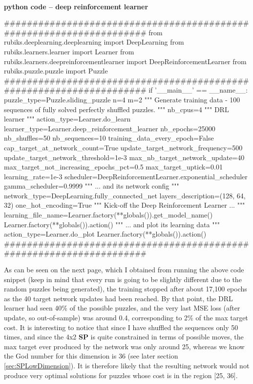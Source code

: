 \paragraph{}{\textbf{python code -- deep reinforcement learner}}
\begin{python}
####################################################################
from rubiks.deeplearning.deeplearning import DeepLearning
from rubiks.learners.learner import Learner
from rubiks.learners.deepreinforcementlearner import DeepReinforcementLearner
from rubiks.puzzle.puzzle import Puzzle
####################################################################
if '__main__' == __name__:
    puzzle_type=Puzzle.sliding_puzzle
    n=4
    m=2
    """ Generate training data - 100 sequences of fully 
    solved perfectly shuffled puzzles. 
    """
    nb_cpus=4
    """ DRL learner """
    action_type=Learner.do_learn
    learner_type=Learner.deep_reinforcement_learner
    nb_epochs=25000
    nb_shuffles=50
    nb_sequences=10
    training_data_every_epoch=False
    cap_target_at_network_count=True
    update_target_network_frequency=500
    update_target_network_threshold=1e-3
    max_nb_target_network_update=40
    max_target_not_increasing_epochs_pct=0.5
    max_target_uptick=0.01
    learning_rate=1e-3
    scheduler=DeepReinforcementLearner.exponential_scheduler
    gamma_scheduler=0.9999
    """ ... and its network config """
    network_type=DeepLearning.fully_connected_net
    layers_description=(128, 64, 32)
    one_hot_encoding=True
    """ Kick-off the Deep Reinforcement Learner ... """
    learning_file_name=Learner.factory(**globals()).get_model_name()
    Learner.factory(**globals()).action()
    """ ... and plot its learning data """
    action_type=Learner.do_plot
    Learner.factory(**globals()).action()
####################################################################
\end{python}
\black
As can be seen on the next page, which I obtained from running the above code snippet (keep in mind that every run is going to be slightly different due to the random puzzles being generated), the training stopped after about 17,100 epochs as the 40 target network updates had been reached. By that point, the DRL learner had seen 40\% of the possible puzzles, and the very last MSE loss (after update, so out-of-sample) was around 0.4, corresponding to 2\% of the max target cost. It is interesting to notice that since I have shuffled the sequences only 50 times, and since the 4x2 \textbf{SP} is quite constrained in terms of possible moves, the max target ever produced by the network was only around 25, whereas we know the God number for this dimension is 36 (see later section \ref{sec:SPLowDimension}). It is therefore likely that the resulting network would not produce very optimal solutions for puzzles whose cost is in the region [25, 36]. 




